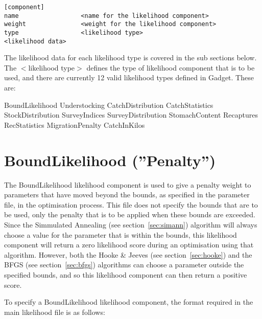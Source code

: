 \documentclass[10pt,twoside]{book}
\begin{document}
{\small\begin{verbatim}
[component]
name                 <name for the likelihood component>
weight               <weight for the likelihood component>
type                 <likelihood type>
<likelihood data>
\end{verbatim}}

The likelihood data for each likelihood type is covered in the sub sections below.  The $<$likelihood type$>$ defines the type of likelihood component that is to be used, and there are currently 12 valid likelihood types defined in Gadget.  These are:

\bigskip
BoundLikelihood\newline
Understocking\newline
CatchDistribution\newline
CatchStatistics\newline
StockDistribution\newline
SurveyIndices\newline
SurveyDistribution\newline
StomachContent\newline
Recaptures\newline
RecStatistics\newline
MigrationPenalty\newline
CatchInKilos

\section{BoundLikelihood (''Penalty'')}\label{sec:boundlike}
The BoundLikelihood likelihood component is used to give a penalty weight to parameters that have moved beyond the bounds, as specified in the parameter file, in the optimisation process.  This file does not specify the bounds that are to be used, only the penalty that is to be applied when these bounds are exceeded.  Since the Simmulated Annealing (see section~\ref{sec:simann}) algorithm will always choose a value for the parameter that is within the bounds, this likelihood component will return a zero likelihood score during an optimisation using that algorithm.  However, both the Hooke \& Jeeves (see section~\ref{sec:hooke}) and the BFGS (see section~\ref{sec:bfgs}) algorithms can choose a parameter outside the specified bounds, and so this likelihood component can then return a positive score.

\bigskip
To specify a BoundLikelihood likelihood component, the format required in the main likelihood file is as follows:
\end{document}
